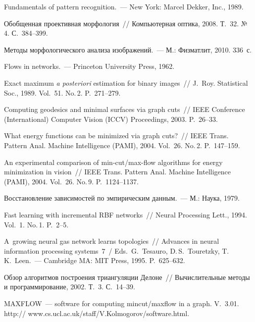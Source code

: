 \begin{multicols}{2}
{{\begin{thebibliography}{99}
Fundamentals of pattern recognition.~--- New York: Marcel Dekker, Inc., 1989.

Обобщенная проективная морфология~// Компьютерная оптика, 2008. Т.~32. №\,4. 
С.~384--399.

Методы морфологического анализа изображений.~--- М.: Физматлит, 2010. 336~с.

Flows in networks.~--- Princeton University Press, 1962.

Exact maximum \textit{a posteriori} estimation for binary images~// J.~Roy. Statistical Soc., 1989. 
Vol.~51. No.\,2. P.~271--279.

Computing geodesics and minimal surfaces via graph cuts~// IEEE  Conference (International) 
Computer Vision (ICCV) Proceedings, 2003. P.~26--33.

What energy functions can be minimized via graph cuts?~// IEEE Trans. Pattern Anal. 
Machine Intelligence (PAMI), 2004. Vol.~26. No.\,2. P.~147--159.

An experimental comparison of min-cut/max-flow algorithms for energy minimization in vision~// 
IEEE Trans. Pattern Anal. Machine Intelligence (PAMI), 2004. Vol.~26. No.\,9. 
P.~1124--1137.

Восстановление зависимостей по эмпирическим данным.~--- М.: Наука, 1979. 

Fast learning with incremental RBF networks~// Neural Processing Lett., 1994. Vol.~1. No.\,1. 
P.~2--5.

A~growing neural gas network learns topologies~// Advances in neural information processing 
systems~7~/ Eds.\ G.~Tesauro, D.\,S.~Touretzky, T.\,K.~Leen.~--- Cambridge MA: MIT Press, 
1995. P.~625--632.


Обзор алгоритмов построения триангуляции Делоне~// Вычислительные методы и 
программирование, 2002. Т.~3. С.~14--39.

\label{end\stat}

MAXFLOW~--- software for computing mincut/maxflow in a graph. V.~3.01. {\sf 
http:// www.cs.ucl.ac.uk/staff/V.Kolmogorov/software.html}.
 \end{thebibliography}
}
}


\end{multicols}